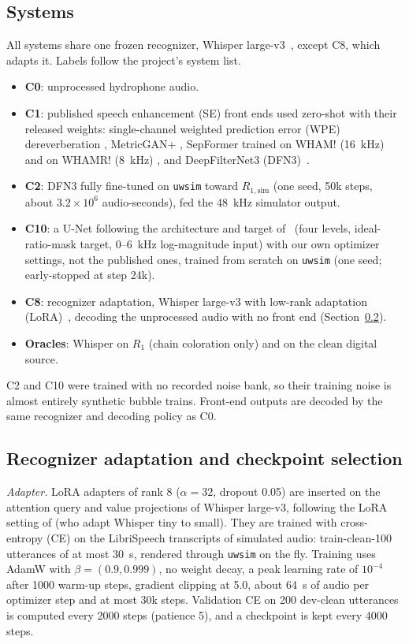 \documentclass[conference]{IEEEtran}
\begin{document}
\subsection{Systems}
\label{sec:systems}
All systems share one frozen recognizer, Whisper large-v3~\cite{radford2023}, except C8, which adapts
it. Labels follow the project's system list.
\begin{itemize}
\item \textbf{C0}: unprocessed hydrophone audio.
\item \textbf{C1}: published speech enhancement (SE) front ends used zero-shot with their released
weights: single-channel weighted prediction error (WPE) dereverberation \cite{nakatani2010,drude2018},
MetricGAN+ \cite{fu2021}, SepFormer \cite{subakan2021} trained on WHAM! (16~kHz) and on WHAMR!
(8~kHz) \cite{wichern2019,maciejewski2020}, and DeepFilterNet3 (DFN3)~\cite{schroeter2023}.
\item \textbf{C2}: DFN3 fully fine-tuned on \texttt{uwsim} toward $R_{1,\mathrm{sim}}$ (one seed,
50k steps, about $3.2\times10^{6}$ audio-seconds), fed the 48~kHz simulator output.
\item \textbf{C10}: a U-Net following the architecture and target of~\cite{roehrdanz2026} (four
levels, ideal-ratio-mask target, 0--6~kHz log-magnitude input) with our own optimizer settings, not the
published ones, trained from scratch on \texttt{uwsim} (one seed; early-stopped at step 24k).
\item \textbf{C8}: recognizer adaptation, Whisper large-v3 with low-rank adaptation
(LoRA)~\cite{hu2022}, decoding the unprocessed audio with no front end (Section~\ref{sec:c8}).
\item \textbf{Oracles}: Whisper on $R_1$ (chain coloration only) and on the clean digital source.
\end{itemize}
C2 and C10 were trained with no recorded noise bank, so their training noise is almost entirely
synthetic bubble trains. Front-end outputs are decoded by the same recognizer and decoding policy as C0.

\subsection{Recognizer adaptation and checkpoint selection}
\label{sec:c8}
\textit{Adapter.} LoRA adapters of rank 8 ($\alpha = 32$, dropout 0.05) are inserted on the attention
query and value projections of Whisper large-v3, following the LoRA setting of \cite{rong2025} (who adapt Whisper tiny to small). They are trained with cross-entropy (CE) on the LibriSpeech transcripts of simulated audio:
train-clean-100 utterances of at most 30~s, rendered through \texttt{uwsim} on the fly. Training uses
AdamW with $\beta = (0.9, 0.999)$, no weight decay, a peak learning rate of $10^{-4}$ after 1000
warm-up steps, gradient clipping at 5.0, about 64~s of audio per optimizer step and at most 30k steps.
Validation CE on 200 dev-clean utterances is computed every 2000 steps (patience 5), and a checkpoint
is kept every 4000 steps.
\end{document}
